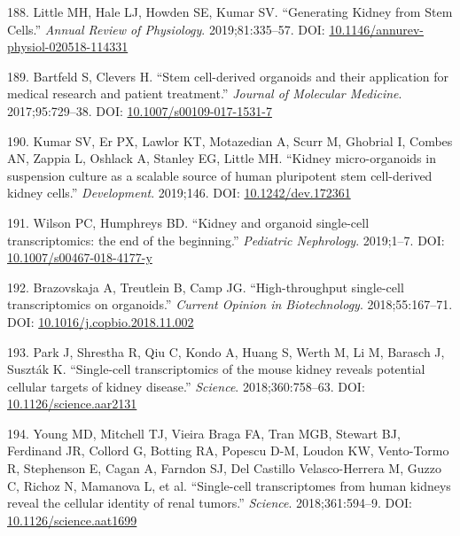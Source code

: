 \documentclass[11pt,a4paper,titlepage,twoside,openright]{style/unimelbthesis}
\theoremstyle{definition}
\theoremstyle{definition}
\theoremstyle{definition}
\theoremstyle{remark}
\begin{document}
\begin{mainmatter}
\leavevmode\hypertarget{ref-Little2019-hf}{}%
188. Little MH, Hale LJ, Howden SE, Kumar SV. ``Generating Kidney from Stem Cells.'' \emph{Annual Review of Physiology}. 2019;81:335--57. DOI: \href{https://doi.org/10.1146/annurev-physiol-020518-114331}{10.1146/annurev-physiol-020518-114331}

\leavevmode\hypertarget{ref-Bartfeld2017-uo}{}%
189. Bartfeld S, Clevers H. ``Stem cell-derived organoids and their application for medical research and patient treatment.'' \emph{Journal of Molecular Medicine}. 2017;95:729--38. DOI: \href{https://doi.org/10.1007/s00109-017-1531-7}{10.1007/s00109-017-1531-7}

\leavevmode\hypertarget{ref-Kumar2019-tz}{}%
190. Kumar SV, Er PX, Lawlor KT, Motazedian A, Scurr M, Ghobrial I, Combes AN, Zappia L, Oshlack A, Stanley EG, Little MH. ``Kidney micro-organoids in suspension culture as a scalable source of human pluripotent stem cell-derived kidney cells.'' \emph{Development}. 2019;146. DOI: \href{https://doi.org/10.1242/dev.172361}{10.1242/dev.172361}

\leavevmode\hypertarget{ref-Wilson2019-mw}{}%
191. Wilson PC, Humphreys BD. ``Kidney and organoid single-cell transcriptomics: the end of the beginning.'' \emph{Pediatric Nephrology}. 2019;1--7. DOI: \href{https://doi.org/10.1007/s00467-018-4177-y}{10.1007/s00467-018-4177-y}

\leavevmode\hypertarget{ref-Brazovskaja2018-fj}{}%
192. Brazovskaja A, Treutlein B, Camp JG. ``High-throughput single-cell transcriptomics on organoids.'' \emph{Current Opinion in Biotechnology}. 2018;55:167--71. DOI: \href{https://doi.org/10.1016/j.copbio.2018.11.002}{10.1016/j.copbio.2018.11.002}

\leavevmode\hypertarget{ref-Park2018-ub}{}%
193. Park J, Shrestha R, Qiu C, Kondo A, Huang S, Werth M, Li M, Barasch J, Suszták K. ``Single-cell transcriptomics of the mouse kidney reveals potential cellular targets of kidney disease.'' \emph{Science}. 2018;360:758--63. DOI: \href{https://doi.org/10.1126/science.aar2131}{10.1126/science.aar2131}

\leavevmode\hypertarget{ref-Young2018-qd}{}%
194. Young MD, Mitchell TJ, Vieira Braga FA, Tran MGB, Stewart BJ, Ferdinand JR, Collord G, Botting RA, Popescu D-M, Loudon KW, Vento-Tormo R, Stephenson E, Cagan A, Farndon SJ, Del Castillo Velasco-Herrera M, Guzzo C, Richoz N, Mamanova L, et al. ``Single-cell transcriptomes from human kidneys reveal the cellular identity of renal tumors.'' \emph{Science}. 2018;361:594--9. DOI: \href{https://doi.org/10.1126/science.aat1699}{10.1126/science.aat1699}


\end{mainmatter}
\end{document}
